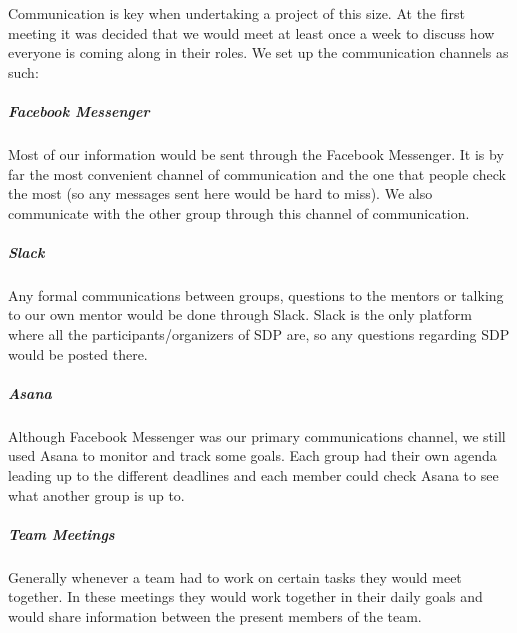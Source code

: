 Communication is key when undertaking a project of this size. At the first meeting it was decided that we would meet at least once a week to discuss how everyone is coming along in their roles. We set up the communication channels as such:

\subparagraph{Facebook Messenger}
Most of our information would be sent through the Facebook Messenger. It is by far the most convenient channel of communication and the one that people check the most (so any messages sent here would be hard to miss). We also communicate with the other group through this channel of communication.
\subparagraph{Slack}
Any formal communications between groups, questions to the mentors or talking to our own mentor would be done through Slack. Slack is the only platform where all the participants/organizers of SDP are, so any questions regarding SDP would be posted there.
\subparagraph{Asana}
Although Facebook Messenger was our primary communications channel, we still used Asana to monitor and track some goals. Each group had their own agenda leading up to the different deadlines and each member could check Asana to see what another group is up to.
\subparagraph{Team Meetings}
Generally whenever a team had to work on certain tasks they would meet together. In these meetings they would work together in their daily goals and would share information between the present members of the team.